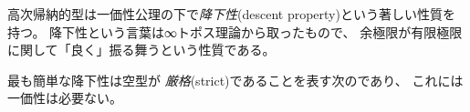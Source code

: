 \documentclass[index]{subfiles}
\begin{document}

高次帰納的型は一価性公理の下で\emph{降下性}(descent property)という著しい性質を持つ。
降下性という言葉は∞トポス理論から取ったもので、
余極限が有限極限に関して「良く」振る舞うという性質である。

最も簡単な降下性は空型\myInlineMath{\myEmptyType}が
\emph{厳格}(strict)であることを表す次のであり、
これには一価性は必要ない。


\end{document}
